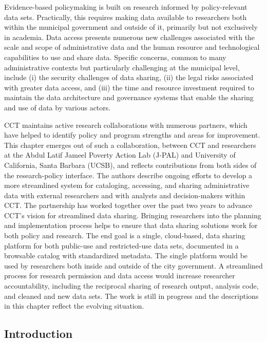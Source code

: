 \documentclass[
]{WileySix}
\begin{document}
Evidence-based policymaking is built on research informed by policy-relevant data sets. Practically, this requires making data available to researchers both within the municipal government and outside of it, primarily but not exclusively in academia. Data access presents numerous new challenges associated with the scale and scope of administrative data and the human resource and technological capabilities to use and share data. Specific concerns, common to many administrative contexts but particularly challenging at the municipal level, include (i) the security challenges of data sharing, (ii) the legal risks associated with greater data access, and (iii) the time and resource investment required to maintain the data architecture and governance systems that enable the sharing and use of data by various actors.

CCT maintains active research collaborations with numerous partners, which have helped to identify policy and program strengths and areas for improvement. This chapter emerges out of such a collaboration, between CCT and researchers at the Abdul Latif Jameel Poverty Action Lab (J-PAL) and University of California, Santa Barbara (UCSB), and reflects contributions from both sides of the research-policy interface. The authors describe ongoing efforts to develop a more streamlined system for cataloging, accessing, and sharing administrative data with external researchers and with analysts and decision-makers within CCT. The partnership has worked together over the past two years to advance CCT's vision for streamlined data sharing. Bringing researchers into the planning and implementation process helps to ensure that data sharing solutions work for both policy and research. The end goal is a single, cloud-based, data sharing platform for both public-use and restricted-use data sets, documented in a browsable catalog with standardized metadata. The single platform would be used by researchers both inside and outside of the city government. A streamlined process for research permission and data access would increase researcher accountability, including the reciprocal sharing of research output, analysis code, and cleaned and new data sets. The work is still in progress and the descriptions in this chapter reflect the evolving situation.

\hypertarget{introduction-7}{%
\subsection{Introduction}\label{introduction-7}}
\end{document}
